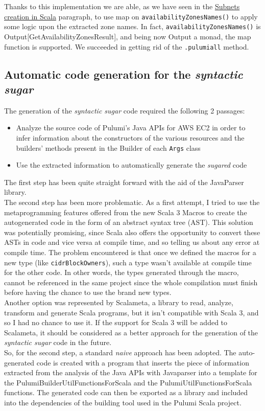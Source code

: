 Thanks to this implementation we are able, as we have seen in the \hyperref[sssec:subnets-creation]{Subnets creation in Scala} paragraph, to use map on \texttt{availabilityZonesNames()} to apply some logic upon the extracted zone names.
In fact, \texttt{availabilityZonesNames()} is Output[GetAvailabilityZonesResult], and being now Output a monad, the map function is supported.
We succeeded in getting rid of the \texttt{.pulumiall} method.

\subsection{Automatic code generation for the \textit{syntactic sugar}}
The generation of the \textit{syntactic sugar} code required the following 2 passages:
\begin{itemize}
  \item Analyze the source code of Pulumi's Java APIs for AWS EC2 in order to infer information about the constructors of the various resources and the builders' methods present in the Builder of each \texttt{Args} class
  \item Use the extracted information to automatically generate the \textit{sugared} code
\end{itemize}
The first step has been quite straight forward with the aid of the JavaParser library.\\
The second step has been more problematic.
As a first attempt, I tried to use the metaprogramming features offered from the new Scala 3 Macros to create the autogenerated code in the form of an \gls{abstract syntax tree} (AST).
This solution was potentially promising, since Scala also offers the opportunity to convert these ASTs in code and vice versa at compile time, and so telling us about any error at compile time.
The problem encountered is that once we defined the macros for a new type (like \texttt{cidrBlockOwners}), such a type wasn't available at compile time for the other code.
In other words, the types generated through the macro, cannot be referenced in the same project since the whole compilation must finish before having the chance to use the brand new types.\\
Another option was represented by Scalameta, a library to read, analyze, transform and generate Scala programs, but it isn't compatible with Scala 3, and so I had no chance to use it.
If the support for Scala 3 will be added to Scalameta, it should be considered as a better approach for the generation of the \textit{syntactic sugar} code in the future.\\
So, for the second step, a standard \textit{naive} approach has been adopted.
The auto-generated code is created with a program that inserts the piece of information extracted from the analysis of the Java APIs with Javaparser into a template for the PulumiBuilderUtilFunctionsForScala and the PulumiUtilFunctionsForScala functions.
The generated code can then be exported as a library and included into the dependencies of the building tool used in the Pulumi Scala project.

